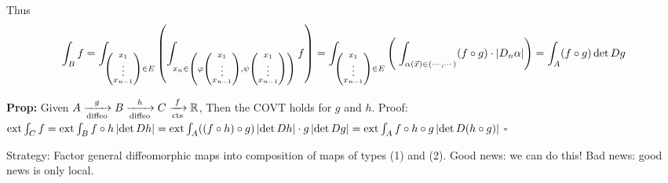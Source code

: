 \documentclass[10pt,letterpaper]{article}
\newcommand{\n}{\hfill\break}
\newcommand{\prop}[1]{\par\noindent\settowidth{\hangindent}{\textbf{Prop: }}\textbf{Prop: }#1\n}
\newcommand{\proven}{\;$\square$\n}
\newcommand{\ptxt}[1]{\textrm{\textnormal{#1}}}
\newcommand{\reals}{\mathbb{R}}
\newcommand{\R}{\reals}
\newcommand{\abs}[1]{\left|#1\right|}
\newcommand{\of}{\circ}
\newcommand{\extint}{\ptxt{ext}\int}
\newcommand{\paren}[1]{\left(#1\right)}
\begin{document}
\par\noindent Thus
\[
\int_{B}f=\int_{\paren{\begin{subarray}{c}x_{1}\\ \vdots\\ x_{n-1}\end{subarray}}\in{}E}\paren{\int_{x_{n}\in\paren{\varphi\paren{\begin{subarray}{c}x_{1}\\ \vdots\\ x_{n-1}\end{subarray}},\psi\paren{\begin{subarray}{c}x_{1}\\ \vdots\\ x_{n-1}\end{subarray}}}}f}=\int_{\paren{\begin{subarray}{c}x_{1}\\ \vdots\\ x_{n-1}\end{subarray}}\in{}E}\paren{\;\int_{\alpha(\vec{x})\in(\cdots,\cdots)}(f\of{}g)\cdot\abs{D_{n}\alpha}}=\int_{A}(f\of{}g)\det{}Dg
\]

\prop{Given $A\xrightarrow[\ptxt{diffeo}]{g}B\xrightarrow[\ptxt{diffeo}]{h}C\xrightarrow[\ptxt{cts}]{f}\R$, Then the COVT holds for $g$ and $h$.\n
Proof:\n
$\extint_{C}f=\extint_{B}f\of{}h\abs{\det{}Dh}=\extint_{A}((f\of{}h)\of{}g)\abs{\det{}Dh}\cdot{}g\abs{\det{}Dg}=\extint_{A}f\of{}h\of{}g\abs{\det{}D(h\of{}g)}$\n
\proven}

\par\noindent Strategy: Factor general diffeomorphic maps into composition of maps of types (1) and (2).\n
Good news: we can do this!\n
Bad news: good news is only local.
\end{document}
